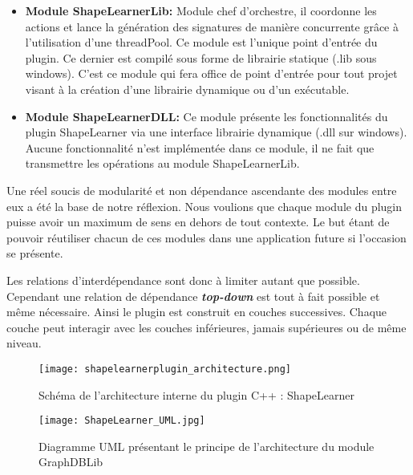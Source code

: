 \begin{itemize}
	 \item \textbf{Module ShapeLearnerLib: } Module chef d'orchestre, il coordonne les actions et lance la génération des signatures de manière concurrente grâce à l'utilisation d'une threadPool. Ce module est l'unique point d'entrée du plugin. Ce dernier est compilé sous forme de librairie statique (.lib sous windows). C'est ce module qui fera office de point d'entrée pour tout projet visant à la création d'une librairie dynamique ou d'un exécutable.\\
	 
	 \item \textbf{Module ShapeLearnerDLL: } Ce module présente les fonctionnalités du plugin ShapeLearner via une interface librairie dynamique (.dll sur windows). Aucune fonctionnalité n'est implémentée dans ce module, il ne fait que transmettre les opérations au module ShapeLearnerLib.\\
\end{itemize} 

Une réel soucis de modularité et non dépendance ascendante des modules entre eux a été la base de notre réflexion. Nous voulions que chaque module du plugin puisse avoir un maximum de sens en dehors de tout contexte. Le but étant de pouvoir réutiliser chacun de ces modules dans une application future si l'occasion se présente. 

Les relations d'interdépendance sont donc à limiter autant que possible. Cependant une relation de dépendance \textbf{\textit{top-down}} est tout à fait possible et même nécessaire. Ainsi le plugin est construit en couches successives. Chaque couche peut interagir avec les couches inférieures, jamais supérieures ou de même niveau.

\clearpage

 \begin{figure}[H]
    \centering
    \texttt{[image: shapelearnerplugin\_architecture.png]}
	\caption{Schéma de l'architecture interne du plugin C++ : ShapeLearner}\label{image.archiShapeLearner} 
\end{figure}

\clearpage

 \begin{figure}[H]
    \centering
    \texttt{[image: ShapeLearner\_UML.jpg]}
	\caption{Diagramme UML présentant le principe de l'architecture du module GraphDBLib}\label{image.UMLGraphDBLib} 
\end{figure}

